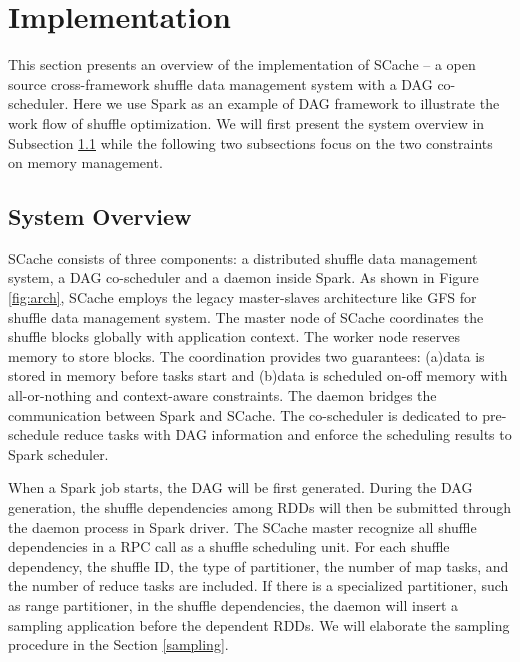\section{Implementation}\label{impl}
This section presents an overview of the implementation of SCache -- a open source cross-framework shuffle data management system with a DAG co-scheduler. Here we use Spark as an example of DAG framework to illustrate the work flow of shuffle optimization. We will first present the system overview in Subsection \ref{arch} while the following two subsections focus on the two constraints on memory management.

\subsection{System Overview}\label{arch}
SCache consists of three components: a distributed shuffle data management system, a DAG co-scheduler and a daemon inside Spark. As shown in Figure \ref{fig:arch}, SCache employs the legacy master-slaves architecture like GFS \cite{gfs} for shuffle data management system. 
The master node of SCache coordinates the shuffle blocks globally with application context. The worker node reserves memory to store blocks.
The coordination provides two guarantees: (a)data is stored in memory before tasks start and (b)data is scheduled on-off memory with all-or-nothing and context-aware constraints. 
The daemon bridges the communication between Spark and SCache. The co-scheduler is dedicated to pre-schedule reduce tasks with DAG information and enforce the scheduling results to Spark scheduler.

When a Spark job starts, the DAG will be first generated. 
During the DAG generation, the shuffle dependencies among RDDs will then be submitted through the daemon process in Spark driver. The SCache master recognize all shuffle dependencies in a RPC call as a shuffle scheduling unit.
For each shuffle dependency, the shuffle ID, the type of partitioner, the number of map tasks, and the number of reduce tasks are included.  If there is a specialized partitioner, such as range partitioner, in the shuffle dependencies, the daemon will insert a sampling application before the dependent RDDs. We will elaborate the sampling procedure in the Section \ref{sampling}.

